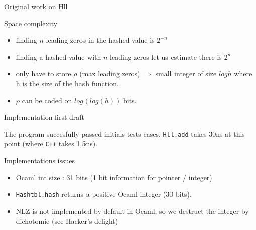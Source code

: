 \documentclass{beamer}
\begin{document}
\begin{frame}{Original work on Hll}
  \begin{exampleblock}{Space complexity}
    \begin{itemize}
    \item finding $n$ leading zeros in the hashed value is
      $2^{-n}$
    \item finding a hashed value with $n$ leading zeros let us
      estimate there is $2^{n}$
    \item only have to store $\rho$ (max leading zeros)
      $\Rightarrow$ small integer of size $log h$ where h is the
      size of the hash function. 
    \item $\rho$ can be coded on
      $log(log(h))$ bits.
    \end{itemize}
  \end{exampleblock}
\end{frame}


\begin{frame}{Implementation first draft}

  The program succesfully passed initials tests
  cases. \texttt{Hll.add} takes 30ns at this point (where \texttt{C++}
  takes 1.5ns).

  

  \begin{alertblock}{Implementations issues}
    \begin{itemize}
    \item Ocaml int size : 31 bits (1 bit information for pointer / integer)
    \item \texttt{Hashtbl.hash} returns a positive Ocaml integer (30 bits).
    \item NLZ is not implemented by default in Ocaml, so we
        destruct the integer by dichotomie (see Hacker's delight)
    \end{itemize}

  \end{alertblock}
\end{frame}
  
\end{document}

